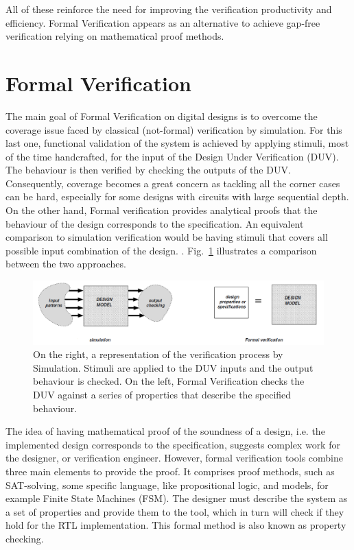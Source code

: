 All of these reinforce the need for improving the verification productivity and efficiency. Formal Verification appears as an alternative to achieve gap-free verification relying on mathematical proof methods. 

\section{Formal Verification}

The main goal of Formal Verification on digital designs is to overcome the coverage issue faced by classical (not-formal) verification by simulation. For this last one, functional validation of the system is achieved by applying stimuli, most of the time handcrafted, for the input of the Design Under Verification (DUV). The behaviour is then verified by checking the outputs of the DUV. Consequently, coverage becomes a great concern as tackling all the corner cases can be hard, especially for some designs with circuits with large sequential depth. On the other hand, Formal verification provides analytical proofs that the behaviour of the design corresponds to the specification. An equivalent comparison to simulation verification would be having stimuli that covers all possible input combination of the design. \cite{thesis-formal}. Fig.~\ref{fig:sim-vs-formal} illustrates a comparison between the two approaches.

\begin{figure}[htb!]
	\centering
	\includegraphics[width=\textwidth]{images/sim_vs_formal.PNG}
	\caption{On the right, a representation of the verification process by Simulation. Stimuli are applied to the DUV inputs and the output behaviour is checked. On the left, Formal Verification checks the DUV against a series of properties that describe the specified behaviour. \cite{thesis-formal}}
	\label{fig:sim-vs-formal}
\end{figure}

The idea of having mathematical proof of the soundness of a design, i.e. the implemented design corresponds to the specification, suggests complex work for the designer, or verification engineer. However, formal verification tools combine three main elements to provide the proof. It comprises proof methods, such as SAT-solving, some specific language, like propositional logic, and models, for example Finite State Machines (FSM). The designer must describe the system as a set of properties and provide them to the tool, which in turn will check if they hold for the RTL implementation. This formal method is also known as property checking. 

